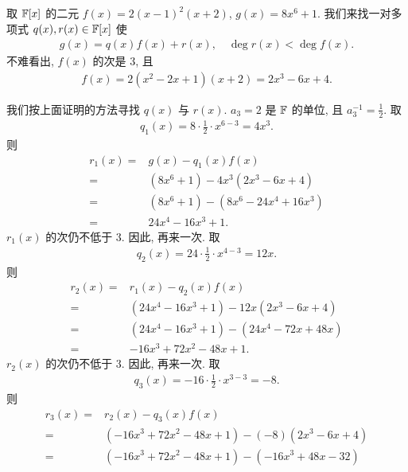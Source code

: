 \begin{example}
    取 $\mathbb{F}[x]$ 的二元 $f(x) = 2(x-1)^2 (x+2)$, $g(x) = 8x^6 + 1$. 我们来找一对多项式 $q(x), r(x) \in \mathbb{F}[x]$ 使
    \begin{align*}
        g(x) = q(x) f(x) + r(x), \quad \deg r(x) < \deg f(x).
    \end{align*}
    不难看出, $f(x)$ 的次是 3, 且
    \begin{align*}
        f(x) = 2(x^2 - 2x + 1)(x+2) = 2x^3 - 6x + 4.
    \end{align*}

    我们按上面证明的方法寻找 $q(x)$ 与 $r(x)$. $a_3 = 2$ 是 $\mathbb{F}$ 的单位, 且 $a_3^{-1} = \frac12$. 取
    \begin{align*}
        q_1 (x) = 8\cdot \frac12 \cdot x^{6-3} = 4x^3.
    \end{align*}
    则
    \begin{align*}
        r_1 (x)
        = {} & g(x) - q_1(x) f(x)                  \\
        = {} & (8x^6 + 1) - 4x^3 (2x^3 - 6x + 4)   \\
        = {} & (8x^6 + 1) - (8x^6 - 24x^4 + 16x^3) \\
        = {} & 24x^4 - 16x^3 + 1.
    \end{align*}
    $r_1 (x)$ 的次仍不低于 $3$. 因此, 再来一次. 取
    \begin{align*}
        q_2 (x) = 24 \cdot \frac12 \cdot x^{4-3} = 12x.
    \end{align*}
    则
    \begin{align*}
        r_2 (x)
        = {} & r_1 (x) - q_2(x) f(x)                     \\
        = {} & (24x^4 - 16x^3 + 1) - 12x (2x^3 - 6x + 4) \\
        = {} & (24x^4 - 16x^3 + 1) - (24x^4 - 72x + 48x) \\
        = {} & -16x^3 + 72x^2 - 48x + 1.
    \end{align*}
    $r_2 (x)$ 的次仍不低于 $3$. 因此, 再来一次. 取
    \begin{align*}
        q_3 (x) = -16 \cdot \frac12 \cdot x^{3-3} = -8.
    \end{align*}
    则
    \begin{align*}
        r_3 (x)
        = {} & r_2 (x) - q_3(x) f(x)                             \\
        = {} & (-16x^3 + 72x^2 - 48x + 1) - (-8) (2x^3 - 6x + 4) \\
        = {} & (-16x^3 + 72x^2 - 48x + 1) - (-16x^3 + 48x - 32)  \\

\end{align*}
\end{example}
